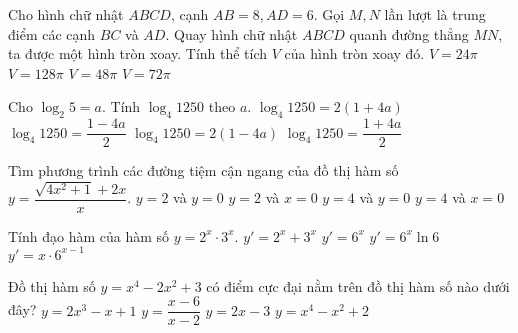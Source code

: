 \begin{ex}%
Cho hình chữ nhật $ABCD$, cạnh $AB=8,AD=6$. Gọi $M,N$ lần lượt là trung điểm các cạnh $BC$ và $AD$. Quay hình chữ nhật $ABCD$ quanh đường thẳng $MN$, ta được một hình tròn xoay. Tính thể tích $V$ của hình tròn xoay đó.
\choice
{$V=24 \pi$}
{$V=128 \pi$}
{$V=48\pi$}
{\True $V=72 \pi $}
\end{ex}

\begin{ex}%
Cho $\log_2 5 =a$. Tính $\log_4 1250$ theo $a$.
\choice
{$\log_4 1250=2(1+4a)$}
{$\log_4 1250=\dfrac{1-4a}{2} $}
{$\log_4 1250=2(1-4a)$}
{\True $\log_4 1250=\dfrac{1+4a}{2} $}
\end{ex}

\begin{ex}%
Tìm phương trình các đường tiệm cận ngang của đồ thị hàm số $y=\dfrac{\sqrt{4x^2+1}+2x}{x}$.
\choice
{$y=2$ và $y=0$}
{$y=2$ và $x=0$}
{\True $y=4$ và $y=0$}
{$y=4$ và $x=0$}
\end{ex}

\begin{ex}%
Tính đạo hàm của hàm số $y=2^x\cdot 3^x$.
\choice
{$y'=2^x+3^x$}
{$y'=6^x$}
{\True $y'=6^x \ln 6 $}
{$y'=x\cdot 6^{x-1}$}
\end{ex}

\begin{ex}%
Đồ thị hàm số $y=x^4-2x^2+3$ có điểm cực đại nằm trên đồ thị hàm số nào dưới đây? 
\choice
{$y=2x^3-x+1$}
{\True $y=\dfrac{x-6}{x-2} $}
{$y=2x-3$}
{$y=x^4-x^2+2$}
\end{ex}

